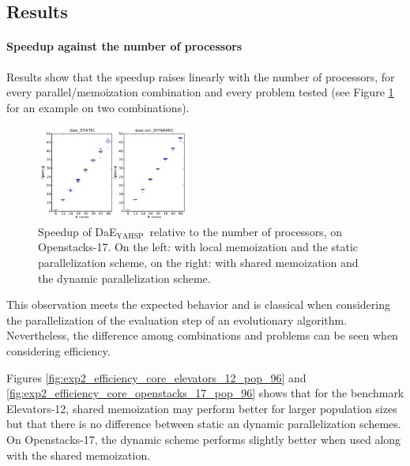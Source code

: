 \documentclass{sig-alternate}
\newcommand{\DAEYAHSP}{{\sc DaE$_{\text{YAHSP}}$}}
\newcommand{\OPENSTACKS}{{\sc Openstacks}}
\newcommand{\ELEVATORS}{{\sc Elevators}}
\begin{document}
\subsection{Results}
\label{section:results}

\paragraph{Speedup against the number of processors}
Results show that the speedup raises linearly with the number of processors, for every parallel/memoization combination and every problem tested (see Figure \ref{fig:exp2_speedup_core_openstack_17_pop_96_nosm-static_vs_sm-dynamic} for an example on two combinations).

\begin{figure}[htpb]
\begin{center}
\includegraphics[width=0.45\textwidth]{images/EXP2_Speed_up_IPC6_TEMPO_OPENSTACKS_17_S96_nosm-static_sm_vs_dynamic.pdf}
\caption{Speedup of \DAEYAHSP\ relative to the number of processors, on \OPENSTACKS-17.
On the left: with local memoization and the static parallelization scheme, on the right: with shared memoization and the dynamic parallelization scheme.}
\label{fig:exp2_speedup_core_openstack_17_pop_96_nosm-static_vs_sm-dynamic}
\end{center}
\end{figure}

This observation meets the expected behavior and is classical when considering the parallelization of the evaluation step of an evolutionary algorithm. Nevertheless, the difference among combinations and problems can be seen when considering efficiency.

Figures \ref{fig:exp2_efficiency_core_elevators_12_pop_96} and
\ref{fig:exp2_efficiency_core_openstacks_17_pop_96} shows that for the
benchmark \ELEVATORS-12, shared memoization may perform better for larger
population sizes but that there is no difference between static an dynamic
parallelization schemes. On \OPENSTACKS-17, the dynamic scheme performs
slightly better when used along with the shared memoization.
\end{document}
